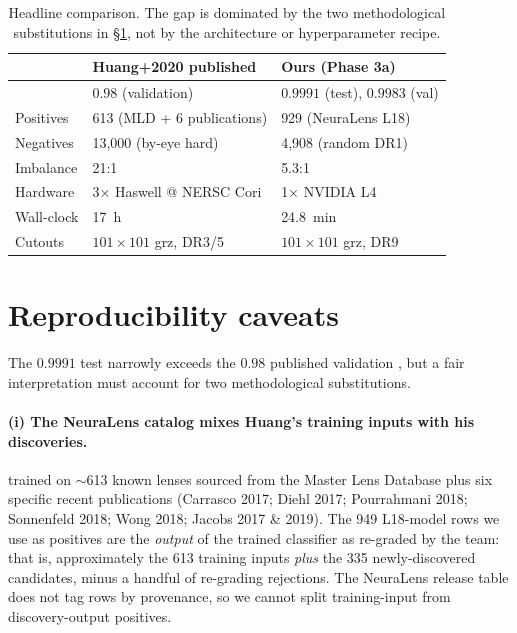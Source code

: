 \documentclass[11pt,letterpaper]{article}
\begin{document}
\begin{table}[ht]
\centering
\caption{Headline comparison. The \AUC{} gap is dominated by the two
methodological substitutions in \S\ref{sec:caveats}, not by the
architecture or hyperparameter recipe.}
\label{tab:results}
\begin{tabular}{lll}
\toprule
                  & Huang+2020 published          & Ours (Phase 3a) \\
\midrule
\AUC{}            & $0.98$ (validation)           & $\mathbf{0.9991}$ (test), $0.9983$ (val) \\
Positives         & 613 (MLD + 6 publications)    & 929 (NeuraLens L18) \\
Negatives         & 13{,}000 (by-eye hard)        & 4{,}908 (random DR1) \\
Imbalance         & 21:1                          & 5.3:1 \\
Hardware          & 3× Haswell @ NERSC Cori       & 1× NVIDIA L4 \\
Wall-clock        & 17~h                          & 24.8~min \\
Cutouts           & $101 \times 101$ grz, DR3/5   & $101 \times 101$ grz, DR9 \\
\bottomrule
\end{tabular}
\end{table}

\section{Reproducibility caveats}
\label{sec:caveats}

The $0.9991$ test \AUC{} narrowly exceeds the $0.98$ published
\textcite{huang2020decals} validation \AUC{}, but a fair interpretation
must account for two methodological substitutions.

\paragraph{(i) The NeuraLens catalog mixes Huang's training inputs with
his discoveries.}
\textcite{huang2020decals} trained on $\sim$613 known lenses sourced from
the Master Lens Database \autocite{moustakas2012mld} plus six specific
recent publications (Carrasco 2017; Diehl 2017; Pourrahmani 2018;
Sonnenfeld 2018; Wong 2018; Jacobs 2017 \& 2019). The 949 L18-model rows
we use as positives are the \emph{output} of the trained classifier as
re-graded by the team: that is, approximately the 613 training inputs
\emph{plus} the 335 newly-discovered candidates, minus a handful of
re-grading rejections. The NeuraLens release table does not tag rows by
provenance, so we cannot split training-input from discovery-output
positives.
\end{document}
